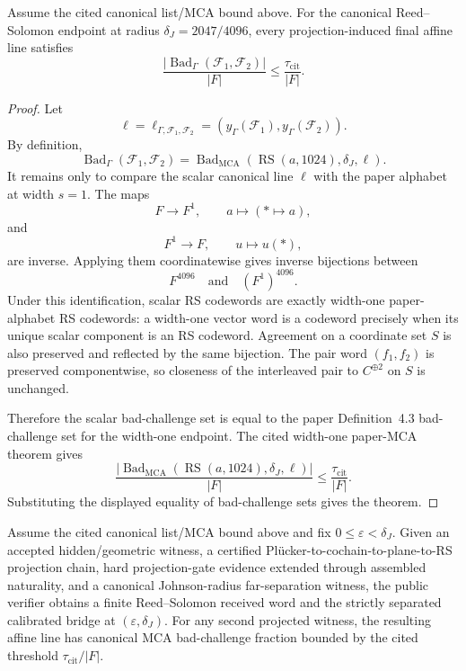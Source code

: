 \begin{theorem}\label{thm:canonical-rs-mca}
Assume the cited canonical list/MCA bound above. For the canonical \HE{}
Reed--Solomon endpoint at radius
\(\delta_J=2047/4096\), every projection-induced final affine line satisfies
\[
  \frac{|\operatorname{Bad}_{\Gamma}(\mathcal F_1,\mathcal F_2)|}{|F|}
  \le
  \frac{\tau_{\mathrm{cit}}}{|F|}.
\]
\end{theorem}

\begin{proof}
Let
\[
  \ell=\ell_{\Gamma,\mathcal F_1,\mathcal F_2}
  =
  (y_\Gamma(\mathcal F_1),y_\Gamma(\mathcal F_2)).
\]
By definition,
\[
  \operatorname{Bad}_{\Gamma}(\mathcal F_1,\mathcal F_2)
  =
  \operatorname{Bad}_{\mathrm{MCA}}
  (\operatorname{RS}(a,1024),\delta_J,\ell).
\]
It remains only to compare the scalar canonical line \(\ell\) with the paper
alphabet at width \(s=1\). The maps
\[
  F\longrightarrow F^1,\qquad a\longmapsto(\ast\mapsto a),
\]
and
\[
  F^1\longrightarrow F,\qquad u\longmapsto u(\ast),
\]
are inverse. Applying them coordinatewise gives inverse bijections between
\[
  F^{4096}
  \quad\text{and}\quad
  (F^1)^{4096}.
\]
Under this identification, scalar RS codewords are exactly width-one
paper-alphabet RS codewords: a width-one vector word is a codeword precisely
when its unique scalar component is an RS codeword. Agreement on a coordinate
set \(S\) is also preserved and reflected by the same bijection. The pair word
\((f_1,f_2)\) is preserved componentwise, so closeness of the interleaved pair
to \(C^{\oplus2}\) on \(S\) is unchanged.

Therefore the scalar bad-challenge set is equal to the paper Definition~4.3
bad-challenge set for the width-one endpoint. The cited width-one paper-MCA
theorem gives
\[
  \frac{
    |\operatorname{Bad}_{\mathrm{MCA}}
      (\operatorname{RS}(a,1024),\delta_J,\ell)|
  }{|F|}
  \le
  \frac{\tau_{\mathrm{cit}}}{|F|}.
\]
Substituting the displayed equality of bad-challenge sets gives the theorem.
\end{proof}

\begin{corollary}\label{cor:verifier-rs-mca}
Assume the cited canonical list/MCA bound above and fix
\(0\le\varepsilon<\delta_J\). Given an accepted
hidden/geometric witness, a certified
Pl\"ucker-to-cochain-to-plane-to-RS projection chain, hard projection-gate
evidence extended through assembled naturality, and a canonical
Johnson-radius far-separation witness, the public verifier obtains a finite
Reed--Solomon received word and the strictly separated calibrated bridge at
\((\varepsilon,\delta_J)\). For any second projected witness, the resulting
affine line has canonical MCA bad-challenge fraction bounded by the cited
threshold \(\tau_{\mathrm{cit}}/|F|\).
\end{corollary}

